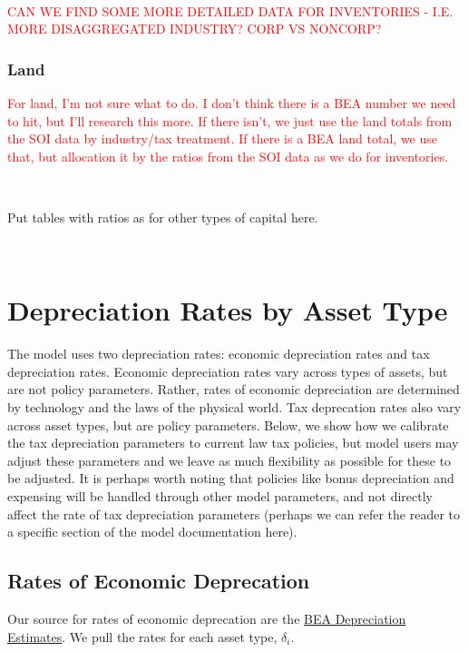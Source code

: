\documentclass[article,11pt,letterpaper,fleqn]{article}
\theoremstyle{definition}
\numberwithin{equation}{section}
\begin{document}
\ \\
\textcolor{red}{CAN WE FIND SOME MORE DETAILED DATA FOR INVENTORIES - I.E. MORE DISAGGREGATED INDUSTRY?  CORP VS NONCORP?}
\ \\

\subsubsection{Land}

\textcolor{red}{For land, I'm not sure what to do.  I don't think there is a BEA number we need to hit, but I'll research this more.  If there isn't, we just use the land totals from the SOI data by industry/tax treatment.  If there is a BEA land total, we use that, but allocation it by the ratios from the SOI data as we do for inventories.}

\ \\
\begin{center}
Put tables with ratios as for other types of capital here.
\end{center}
\ \\


\section{Depreciation Rates by Asset Type}
\label{sec:depr_rates}

The model uses two depreciation rates: economic depreciation rates and tax depreciation rates.  Economic depreciation rates vary across types of assets, but are not policy parameters.  Rather, rates of economic depreciation are determined by technology and the laws of the physical world.  Tax deprecation rates also vary across asset types, but are policy parameters.  Below, we show how we calibrate the tax depreciation parameters to current law tax policies, but model users may adjust these parameters and we leave as much flexibility as possible for these to be adjusted.  It is perhaps worth noting that policies like bonus depreciation and expensing will be handled through other model parameters, and not directly affect the rate of tax depreciation parameters (perhaps we can refer the reader to a specific section of the model documentation here). 

\subsection{Rates of Economic Deprecation}
Our source for rates of economic deprecation are the \href{http://bea.gov/national/FA2004/Tablecandtext.pdf}{BEA Depreciation Estimates}.  We pull the rates for each asset type, $\delta_{i}$.
\end{document}
